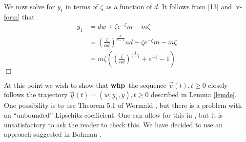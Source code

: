 \documentclass[11pt]{article}
\newenvironment{proof}{{\bf Proof:}}{\hfill\mbox{$\Box$}}
\def\a{\alpha}
\def\z{\zeta}
\def\whp{{\bf whp}}
\newcommand{\ignore}[1]{}
\def\vv{\vec{v}}
\def\yy{\vec{y}}
\newcommand{\brac}[1]{\left(#1\right)}
\newcommand{\bfrac}[2]{\brac{\frac{#1}{#2}}}
\begin{document}
\begin{proof}
{\large
{\bf
\ignore{
Using \eqref{v-form} in \eqref{dv1} we get
\begin{align*}
\frac{dy_1}{dz}\frac{dz}{dt} &= \frac{dy_1}{dt} \\
&= -1 -\frac{d-1}{dw}y_1 +\frac{d-1}{dw}\frac{vz^2}{f(z)}\\
&= -1 + \frac{1}{z}\frac{dz}{dt}y_1 - \frac{1}{z}\frac{dz}{dt}\frac{vz^2}{f(z)}\\
&= -1 + \frac{dz}{dt}\frac{y_1}{z}-\frac{dz}{dt}ze^{-z}m
\end{align*}
Dividing through by $\frac{dz}{dt}$ we get
\begin{equation*}
\frac{dy_1}{dz} = \frac{dw}{(d-1)z} + \frac{y_1}{z} - ze^{-z}m
\end{equation*}
and dividing by $z$ and collecting $y_1$ on LHS gives
\begin{align*}
\frac{d}{dz}\brac{\frac{y_1}{z}} &= \frac{dw}{(d-1)z^2} - e^{-z}m\\
&= \frac{dn}{\bfrac{nd}{m}^{\frac{d}{d-1}}}\frac{z^{\frac{1}{d-1}-1}}{d-1} - e^{-z}m
\end{align*}
Integrating with respect to $z$ and pluggin in $y_1(0) = z(0)e^{-z(0)}m$ gives
\begin{equation}\label{v1-form}
\frac{y_1}{z} = \frac{dn}{\bfrac{nd}{m}^{\frac{1}{d-1}}} + e^{-z}m
\end{equation}
Do we need to derive \eqref{v1-form}? It is not used for the next derivation.
}
}
}

We now solve for $y_1$ in terms of $\z$ as a function of $d$. It follows from \eqref{13} and 
\eqref{v-form} that
\begin{align*}
y_1 &= dw+\z e^{-\z}m-m\z \\
&= \bfrac{\z}{\a d}^{\frac{d}{d-1}}nd + \z e^{-\z}m -m\z\\
&= m\z\brac{\bfrac{\z}{\a d}^{\frac{1}{d-1}} + e^{-\z}-1}
\end{align*}
\end{proof}

At this point we wish to show that \whp\ the sequence $\vv(t),t\geq 0$ closely follows the trajectory
$\yy(t)=(w,y_1,y),t\geq 0$
described in Lemma \ref{lemde}. One possibility is to use Theorem 5.1 of Wormald \cite{Wormald}, but there
is a problem with an ``unbounded'' Lipschitz coefficient. 
One can allow for this in \cite{Wormald}, but it is unsatisfactory to ask the reader to 
check this. We have decided to use an approach suggested in Bohman \cite{r3t}. 
\end{document}
